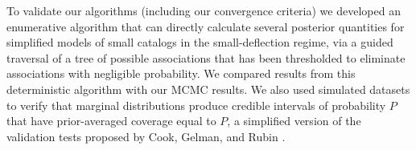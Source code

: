 To validate our algorithms (including our convergence criteria) we developed
an enumerative algorithm that can directly calculate several posterior
quantities for simplified models of small catalogs in the small-deflection
regime, via a guided traversal of a tree of possible associations that has
been thresholded to eliminate associations with negligible probability.  We
compared results from this deterministic algorithm with our MCMC results. We
also used simulated datasets to verify that marginal distributions produce
credible intervals of probability $P$ that have prior-averaged coverage
equal to $P$, a simplified version of the validation tests proposed by Cook,
Gelman, and Rubin \cite{CGR06-Validn}.

